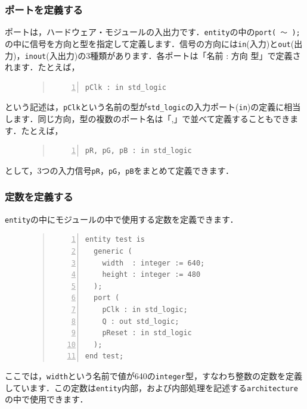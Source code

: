 \documentclass[a4paper,dvipdfmx]{jsarticle}
\begin{document}
\subsubsection{ポートを定義する}
ポートは，ハードウェア・モジュールの入出力です．\verb|entity|の中の\verb|port( 〜 );|の中に信号を方向と型を指定して定義します．信号の方向には\verb|in|(入力)と\verb|out|(出力)，\verb|inout|(入出力)の3種類があります．各ポートは「名前 : 方向 型」で定義されます．たとえば，
\begin{figure}[H]
\begin{quote}
\begin{Verbatim}[frame=single, numbers=left, baselinestretch=0.8]
pClk : in std_logic
\end{Verbatim}
\end{quote}
\end{figure}
という記述は，\verb|pClk|という名前の型が\verb|std_logic|の入力ポート(\verb|in|)の定義に相当します．同じ方向，型の複数のポート名は「,」で並べて定義することもできます．たとえば，
\begin{figure}[H]
\begin{quote}
\begin{Verbatim}[frame=single, numbers=left, baselinestretch=0.8]
pR, pG, pB : in std_logic
\end{Verbatim}
\end{quote}
\end{figure}
として，3つの入力信号\verb|pR|，\verb|pG|，\verb|pB|をまとめて定義できます．

\subsubsection{定数を定義する}
\verb|entity|の中にモジュールの中で使用する定数を定義できます．
\begin{figure}[H]
\begin{quote}
\begin{Verbatim}[frame=single, numbers=left, baselinestretch=0.8]
entity test is
  generic (
    width  : integer := 640;
    height : integer := 480
  );
  port (
    pClk : in std_logic;
    Q : out std_logic;
    pReset : in std_logic
  );
end test;
\end{Verbatim}
\end{quote}
\end{figure}
ここでは，\verb|width|という名前で値が640の\verb|integer|型，すなわち整数の定数を定義しています．この定数は\verb|entity|内部，および内部処理を記述する\verb|architecture|の中で使用できます．
\end{document}
